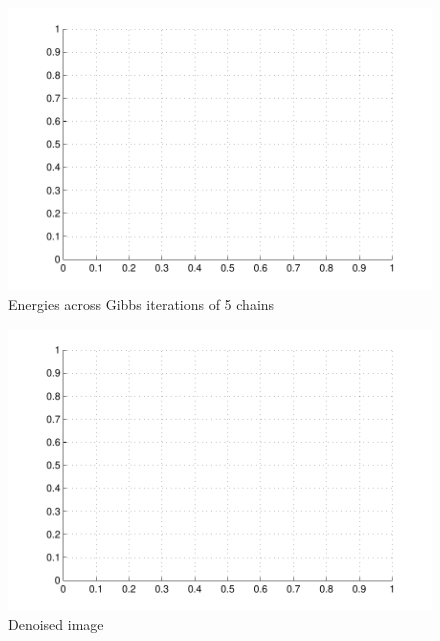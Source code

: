 \documentclass{article}
\begin{document}
\begin{figure}
\begin{center}
\includegraphics{emptiness.pdf}
\caption{Energies across Gibbs iterations of 5 chains}
\end{center}
\end{figure}


\begin{figure}
\begin{center}
\includegraphics{emptiness.pdf}
\end{center}
\caption{Denoised image}
\end{figure}
\end{document}
